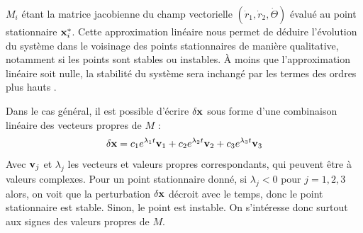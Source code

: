 %
$M_i$ étant la matrice jacobienne du champ vectorielle $(\dot{r}_1, \dot{r}_2, \dot{\Theta})$ évalué au point stationnaire $\vb{x}^*_i$.
%
Cette approximation linéaire nous permet de déduire l'évolution du système dans le voisinage des points stationnaires de manière qualitative, notamment si les points sont stables ou instables. 
À moins que l'approximation linéaire soit nulle, la stabilité du système sera inchangé par les termes des ordres plus hauts \cite{strogatz_nonlinear_2015}.
%
%
%

Dans le cas général, il est possible d'écrire $\delta\vb{x}$ sous forme d'une combinaison linéaire des vecteurs propres de $M$ :
%
\[ \delta\vb{x} = c_1 e^{\lambda_1 t}\vb{v}_1 + c_2 e^{\lambda_2 t}\vb{v}_2 + c_3 e^{\lambda_3 t}\vb{v}_3\]
%
Avec $\vb{v}_j$ et $\lambda_j$ les vecteurs et valeurs propres correspondants, qui peuvent être à valeurs complexes.%
%
Pour un point stationnaire donné, si $\lambda_j < 0$ pour $j = 1, 2, 3$ alors, on voit que la perturbation $\delta\vb{x}$ décroit avec le temps, donc le point stationnaire est stable. Sinon, le point est instable.
%
On s'intéresse donc surtout aux signes des valeurs propres de $M$.
%


